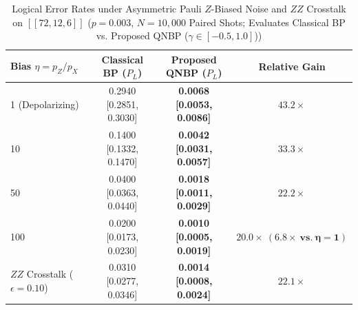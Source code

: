 \begin{table}[t]
\caption{Logical Error Rates under Asymmetric Pauli $Z$-Biased Noise and $ZZ$ Crosstalk on $[[72,12,6]]$ ($p = 0.003$, $N=10,000$ Paired Shots; Evaluates Classical BP vs. Proposed QNBP ($\gamma \in [-0.5, 1.0]$))}
\label{tab:biased_noise}
\centering
\begin{tabular}{lccc}
\toprule
\textbf{Bias $\eta = p_Z / p_X$} & \textbf{Classical BP ($P_L$)} & \textbf{Proposed QNBP ($P_L$)} & \textbf{Relative Gain} \\
\midrule
1 (Depolarizing) & 0.2940 [0.2851, 0.3030] & \textbf{0.0068 [0.0053, 0.0086]} & $\mathbf{43.2\times}$ \\
10 & 0.1400 [0.1332, 0.1470] & \textbf{0.0042 [0.0031, 0.0057]} & $\mathbf{33.3\times}$ \\
50 & 0.0400 [0.0363, 0.0440] & \textbf{0.0018 [0.0011, 0.0029]} & $\mathbf{22.2\times}$ \\
100 & 0.0200 [0.0173, 0.0230] & \textbf{0.0010 [0.0005, 0.0019]} & $\mathbf{20.0\times\ (6.8\times\ \text{vs.}\ \eta=1)}$ \\
$ZZ$ Crosstalk ($\epsilon=0.10$) & 0.0310 [0.0277, 0.0346] & \textbf{0.0014 [0.0008, 0.0024]} & $\mathbf{22.1\times}$ \\
\bottomrule
\end{tabular}
\end{table}
